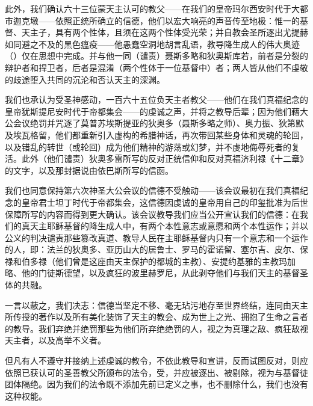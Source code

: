 此外，我们确认六十三位蒙天主认可的教父——在我们的皇帝玛尔西安时代于大都市迦克墩——依照正统所确立的信德，他们以宏大响亮的声音传至地极：惟一的基督、天主子，具有两个性体，且须在这两个性体受光荣；并自教会圣所逐出尤提赫如同避之不及的黑色瘟疫——他愚蠢空洞地胡言乱语，教导降生成人的伟大奥迹（）仅在思想中完成。并与他一同（谴责）聂斯多略和狄奥斯库若，前者是分裂的辩护者和捍卫者，后者是混淆（两个性体于一位基督中）者；两人皆从他们不虔敬的歧途堕入共同的沉沦和否认天主的深渊。\par

我们也承认为受圣神感动，一百六十五位负天主者教父——他们在我们真福纪念的皇帝犹斯提尼安时代于帝都集会——的虔诚之声，并将之教导后辈；因为他们藉大公会议绝罚并咒逐了莫普苏埃斯提亚的狄奥多（聂斯多略之师）、奥力振、狄第默及埃瓦格留，他们都重新引入虚构的希腊神话，再次带回某些身体和灵魂的轮回，以及错乱的转世（或轮回）成为他们精神的游荡或幻梦，并不虔地侮辱死者的复活。此外（他们谴责）狄奥多雷所写的反对正统信仰和反对真福济利禄《十二章》的文字，以及那封据说由依巴斯所写的信函。\par

我们也同意保持第六次神圣大公会议的信德不受触动——该会议最初在我们真福纪念的皇帝君士坦丁时代于帝都集会，这信德因虔诚的皇帝用自己的印玺批准为后世保障所写的内容而得到更大确认。该会议教导我们应当公开宣认我们的信德：在我们的真天主耶稣基督的降生成人中，有两个本性意志或意愿和两个本性运作；并以公义的判决谴责那些篡改真道、教导人民在主耶稣基督内只有一个意志和一个运作的人，即：法兰的狄奥多、亚历山大的居鲁士、罗马的霍诺留、塞尔吉、皮尔、保禄和伯多禄（他们曾是这座由天主保护的都城的主教）、安提约基雅的主教玛加略、他的门徒斯德望，以及疯狂的波里赫罗尼，从此剥夺他们与我们天主的基督圣体的共融。\par

一言以蔽之，我们决志：信德当坚定不移、毫无玷污地存至世界终结，连同由天主所传授的著作以及所有美化装饰了天主的教会、成为世上之光、拥抱了生命之言者的教导。我们弃绝并绝罚那些为他们所弃绝绝罚的人，视之为真理之敌、疯狂敌视天主者，以及高举不义者。\par

但凡有人不遵守并接纳上述虔诚的教令，不依此教导和宣讲，反而试图反对，则应依照已获认可的圣善教父所颁布的法令，受，并应被逐出、被剔除，视为与基督徒团体隔绝。因为我们的法令既不添加先前已定义之事，也不删除什么，我们也没有这种权能。\par


